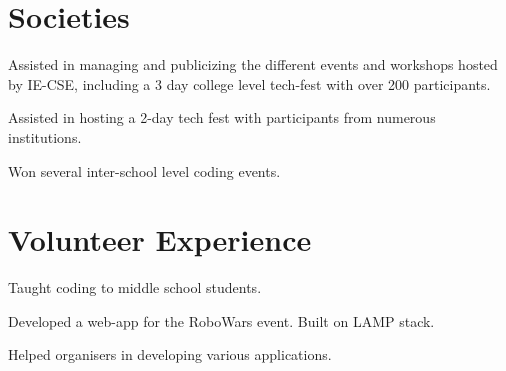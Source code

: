 \documentclass[a4paper]{resume}
\begin{document}
\begin{minipage}[t]{0.66\textwidth}
\sectionspace %


\section{Societies}


\begin{tightitemize}
\item Assisted in managing and publicizing the different events and workshops hosted by IE-CSE, including a 3 day college level tech-fest with over 200 participants.
\end{tightitemize}

\sectionspace %


\begin{tightitemize}
\item Assisted in hosting a 2-day tech fest with participants from numerous institutions.
\item Won several inter-school level coding events.
\end{tightitemize}

\sectionspace %


\section{Volunteer Experience}

Taught coding to middle school students.



\sectionspace %

Developed a web-app for the RoboWars event. Built on LAMP stack.



\sectionspace %

Helped organisers in developing various applications.


\sectionspace %


\end{minipage} %
\end{document}
